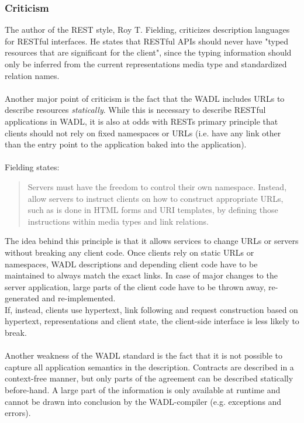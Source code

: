 \subsubsection{Criticism}
The author of the REST style, Roy T. Fielding, criticizes description languages for RESTful interfaces. He states that RESTful APIs should never have "typed resources that are significant for the client", since the typing information should only be inferred from the current representations media type and standardized relation names.  \cite{FIELDBLOG}
\\ \\
Another major point of criticism is the fact that the WADL includes URLs to describe resources \emph{statically}. While this is necessary to describe RESTful applications in WADL, it is also at odds with RESTs primary principle that clients should not rely on fixed namespaces or URLs (i.e. have any link other than the entry point to the application baked into the application).
\\ \\
Fielding states:
\begin{quote}
Servers must have the freedom to control their own namespace. Instead, allow servers to instruct clients on how to construct appropriate URLs, such as is done in HTML forms and URI templates, by defining those instructions within media types and link relations. \cite{FIELDBLOG}
\end{quote}
The idea behind this principle is that it allows services to change URLs or servers without breaking any client code. Once clients rely on static URLs or namespaces, WADL descriptions and depending client code have to be maintained to always match the exact links. In case of major changes to the server application, large parts of the client code have to be thrown away, re-generated and re-implemented.
\\
If, instead, clients use hypertext, link following and request construction based on hypertext, representations and client state, the client-side interface is less likely to break. \cite{GREGBLOG}
\\ \\
Another weakness of the WADL standard is the fact that it is not possible to capture all application semantics in the description. Contracts are described in a context-free manner, but only parts of the agreement can be described statically before-hand. A large part of the information is only available at runtime and cannot be drawn into conclusion by the WADL-compiler (e.g. exceptions and errors).